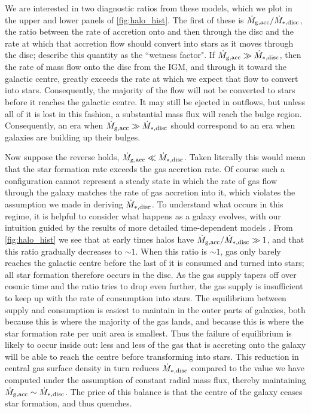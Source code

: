 \documentclass[useAMS,usenatbib]{mn2e}
\begin{document}
We are interested in two diagnostic ratios from these models, which we plot in the upper and lower panels of \autoref{fig:halo_hist}. The first of these is $\dot{M}_{\rm g, acc}/\dot{M}_{*, \rm disc}$, the ratio between the rate of accretion onto and then through the disc and the rate at which that accretion flow should convert into stars as it moves through the disc; \citet{dekel14a} describe this quantity as the ``wetness factor". If $\dot{M}_{\rm g,acc} \gg \dot{M}_{*,\rm disc}$, then the rate of mass flow onto the disc from the IGM, and through it toward the galactic centre, greatly exceeds the rate at which we expect that flow to convert into stars. Consequently, the majority of the flow will not be converted to stars before it reaches the galactic centre. It may still be ejected in outflows, but unless all of it is lost in this fashion, a substantial mass flux will reach the bulge region. Consequently, an era when $\dot{M}_{\rm g,acc} \gg \dot{M}_{*,\rm disc}$ should correspond to an era when galaxies are building up their bulges.

Now suppose the reverse holds, $\dot{M}_{\rm g,acc} \ll \dot{M}_{*,\rm disc}$. Taken literally this would mean that the star formation rate exceeds the gas accretion rate. Of course such a configuration cannot represent a steady state in which the rate of gas flow through the galaxy matches the rate of gas accretion into it, which violates the assumption we made in deriving $\dot{M}_{*,\rm disc}$. To understand what occurs in this regime, it is helpful to consider what happens as a galaxy evolves, with our intuition guided by the results of more detailed time-dependent models \citep[e.g.,][]{forbes14a}. From  \autoref{fig:halo_hist} we see that at early times halos have $\dot{M}_{\rm g, acc}/\dot{M}_{*, \rm disc} \gg 1$, and that this ratio gradually decreases to $\sim 1$. When this ratio is $\sim 1$, gas only barely reaches the galactic centre before the last of it is consumed and turned into stars; all star formation therefore occurs in the disc. As the gas supply tapers off over cosmic time and the ratio tries to drop even further, the gas supply is insufficient to keep up with the rate of consumption into stars. The equilibrium between supply and consumption is easiest to maintain in the outer parts of galaxies, both because this is where the majority of the gas lands, and because this is where the star formation rate per unit area is smallest. Thus the failure of equilibrium is likely to occur inside out: less and less of the gas that is accreting onto the galaxy will be able to reach the centre before transforming into stars. This reduction in central gas surface density in turn reduces $\dot{M}_{*,\rm disc}$ compared to the value we have computed under the assumption of constant radial mass flux, thereby maintaining $\dot{M}_{\rm g,acc} \sim \dot{M}_{*,\rm disc}$. The price of this balance is that the centre of the galaxy ceases star formation, and thus quenches.
\end{document}
